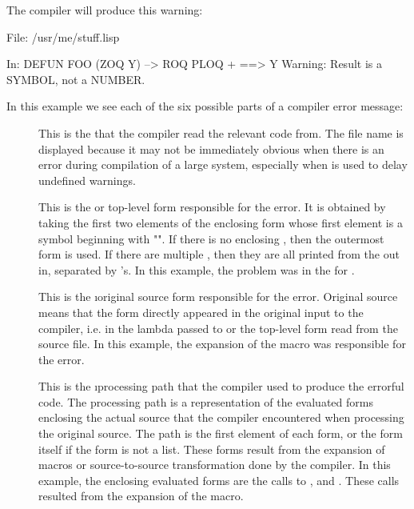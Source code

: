 The compiler will produce this warning:
\begin{example}
File: /usr/me/stuff.lisp

In: DEFUN FOO
  (ZOQ Y)
--> ROQ PLOQ + 
==>
  Y
Warning: Result is a SYMBOL, not a NUMBER.
\end{example}
In this example we see each of the six possible parts of a compiler error
message:
\begin{description}

\item[]
This is the  that the compiler read the relevant code from.  The file
name is displayed because it may not be immediately obvious when there is an
error during compilation of a large system, especially when
 is used to delay undefined warnings.

\item[]
This is the  or top-level form responsible for the error.  It
is obtained by taking the first two elements of the enclosing form whose first
element is a symbol beginning with "".  If there is no enclosing
, then the outermost form is used.  If there are multiple
, then they are all printed from the out in, separated by
\code{=>}'s.  In this example, the problem was in the  for .

\item[]
This is the \i{original source} form responsible for the error.  Original
source means that the form directly appeared in the original input to the
compiler, i.e. in the lambda passed to  or the top-level form read
from the source file.  In this example, the expansion of the  macro was
responsible for the error.

\item[ ]
This is the \i{processing path} that the compiler used to produce the
errorful code.  The processing path is a representation of the evaluated forms
enclosing the actual source that the compiler encountered when processing the
original source.  The path is the first element of each form, or the form
itself if the form is not a list.  These forms result from the expansion of
macros or source-to-source transformation done by the compiler.  In this
example, the enclosing evaluated forms are the calls to ,  and
\code{+}.  These calls resulted from the expansion of the  macro.


\end{description}
